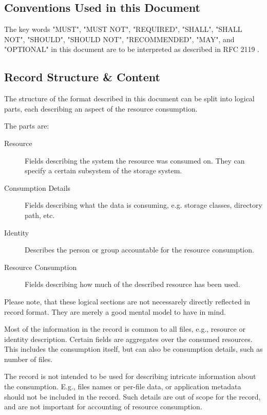 \subsection{Conventions Used in this Document}
The key words "MUST", "MUST NOT", "REQUIRED", "SHALL", "SHALL NOT", 
"SHOULD", "SHOULD NOT", "RECOMMENDED",  "MAY", and 
"OPTIONAL" in this document are to be interpreted as described in
RFC 2119 \cite{rfc2119}.


\subsection{Record Structure \& Content}

The structure of the format described in this document can be split into
logical parts, each describing an aspect of the resource consumption.

The parts are:

\begin{description}

\item[Resource] Fields describing the system the resource was consumed on. They 
can specify a certain subsystem of the storage system.

\item[Consumption Details] Fields describing what the data is consuming, e.g. 
storage classes, directory path, etc.

\item[Identity] Describes the person or group accountable for the resource
consumption.

\item[Resource Consumption] Fields describing how much of the described
resource has been used.

\end{description}

Please note, that these logical sections are not necessarely directly reflected
in record format. They are merely a good mental model to have in mind.

Most of the information in the record is common to all files, e.g., resource or
identity description. Certain fields are aggregates over the consumed
resources. This includes the consumption itself, but can also be consumption
details, such as number of files.

The record is not intended to be used for describing intricate information
about the consumption. E.g., files names or per-file data, or application
metadata should not be included in the record. Such details are out of scope
for the record, and are not important for accounting of resource consumption.

